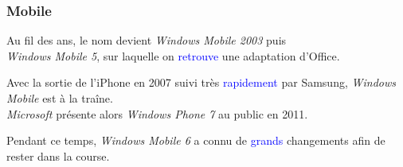 \documentclass[aspectratio=169]{beamer}
\begin{document}
\begin{frame}
  \frametitle{Mobile}
  Au fil des ans, le nom devient \textit{Windows Mobile 2003} puis \\
  \textit{Windows Mobile 5}, sur laquelle on \textcolor{blue}{retrouve} une adaptation
  d'Office.

  \hspace{0.5cm}

  Avec la sortie de l'iPhone en 2007 suivi très \textcolor{blue}{rapidement}
  par Samsung, \textit{Windows Mobile} est à la traîne. \\
  \textit{Microsoft} présente alors \textit{Windows Phone 7} au public en 2011.

  \hspace{0.5cm}

  Pendant ce temps, \textit{Windows Mobile 6} a connu de \textcolor{blue}{grands}
  changements afin de rester dans la course.
\end{frame}
\end{document}

